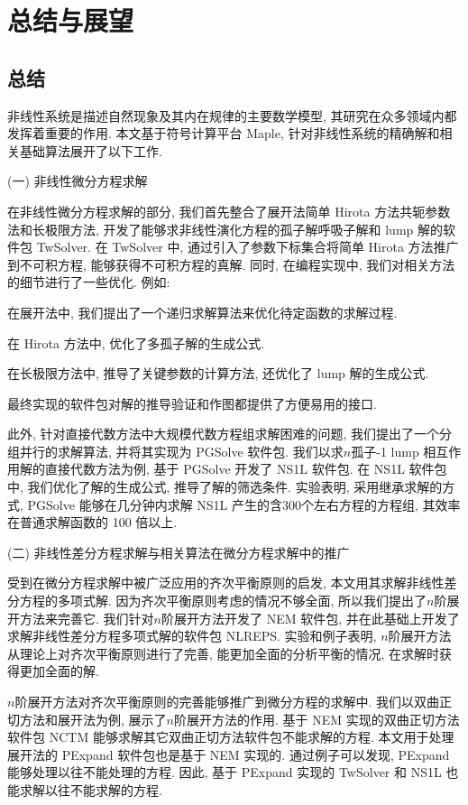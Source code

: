 \chapter{总结与展望}\label{ch07}
\section{总结}
非线性系统是描述自然现象及其内在规律的主要数学模型, 其研究在众多领域内都发挥着重要的作用. 本文基于符号计算平台 Maple, 针对非线性系统的精确解和相关基础算法展开了以下工作.

(一) 非线性微分方程求解

在非线性微分方程求解的部分, 我们首先整合了\Painleve{}展开法\D 简单 Hirota 方法\D 共轭参数法和长极限方法, 开发了能够求非线性演化方程的孤子解\D 呼吸子解和 lump 解的软件包 TwSolver. 在 TwSolver 中, 通过引入了参数下标集合将简单 Hirota 方法推广到不可积方程, 能够获得不可积方程的真解. 同时, 在编程实现中, 我们对相关方法的细节进行了一些优化. 例如:
\begin{compactenum}[(1)]
\item 在\Painleve{}展开法中, 我们提出了一个递归求解算法来优化待定函数的求解过程.
\item 在 Hirota 方法中, 优化了多孤子解的生成公式.
\item 在长极限方法中, 推导了关键参数的计算方法, 还优化了 lump 解的生成公式.
\item 最终实现的软件包对解的推导\D 验证和作图都提供了方便易用的接口. 
\end{compactenum}

此外, 针对直接代数方法中大规模代数方程组求解困难的问题, 我们提出了一个分组并行的求解算法, 并将其实现为 PGSolve 软件包. 我们以求$n$孤子-1 lump 相互作用解的直接代数方法为例, 基于 PGSolve 开发了 NS1L 软件包. 在 NS1L 软件包中, 我们优化了解的生成公式, 推导了解的筛选条件. 实验表明, 采用继承求解的方式, PGSolve 能够在几分钟内求解 NS1L 产生的含300个左右方程的方程组, 其效率在普通求解函数的 100 倍以上.  

(二) 非线性差分方程求解与相关算法在微分方程求解中的推广

受到在微分方程求解中被广泛应用的齐次平衡原则的启发, 本文用其求解非线性差分方程的多项式解. 因为齐次平衡原则考虑的情况不够全面, 所以我们提出了$n$阶展开方法来完善它. 我们针对$n$阶展开方法开发了 NEM 软件包, 并在此基础上开发了求解非线性差分方程多项式解的软件包 NLREPS. 实验和例子表明, $n$阶展开方法从理论上对齐次平衡原则进行了完善, 能更加全面的分析平衡的情况, 在求解时获得更加全面的解. 

$n$阶展开方法对齐次平衡原则的完善能够推广到微分方程的求解中. 我们以双曲正切方法和\Painleve{}展开法为例, 展示了$n$阶展开方法的作用. 基于 NEM 实现的双曲正切方法软件包 NCTM 能够求解其它双曲正切方法软件包不能求解的方程. 本文用于处理\Painleve{}展开法的 PExpand 软件包也是基于 NEM 实现的. 通过例子可以发现, PExpand 能够处理以往不能处理的方程. 因此, 基于 PExpand 实现的 TwSolver 和 NS1L 也能求解以往不能求解的方程. 

